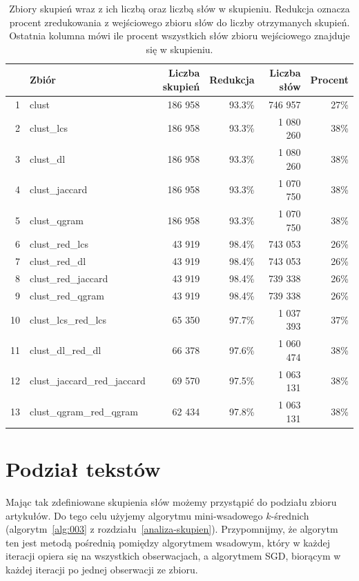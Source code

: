 \documentclass{praca1}
\begin{document}
\begin{table}[!h]
\centering
\begin{tabular}{|rl|rr|rr|}
  \hline
 & Zbiór & Liczba skupień & Redukcja & Liczba słów & Procent \\ 
  \hline
1 & clust & 186 958 & 93.3\% & 746 957 & 27\% \\ 
  2 & clust\_lcs & 186 958 & 93.3\% & 1 080 260 & 38\% \\ 
  3 & clust\_dl & 186 958 & 93.3\% & 1 080 260 & 38\% \\ 
  4 & clust\_jaccard & 186 958 & 93.3\% & 1 070 750 & 38\% \\ 
  5 & clust\_qgram & 186 958 & 93.3\% & 1 070 750 & 38\% \\ \hline
  6 & clust\_red\_lcs & 43 919 & 98.4\% & 743 053 & 26\% \\ 
  7 & clust\_red\_dl & 43 919 & 98.4\% & 743 053 & 26\% \\ 
  8 & clust\_red\_jaccard & 43 919 & 98.4\% & 739 338 & 26\% \\ 
  9 & clust\_red\_qgram & 43 919 & 98.4\% & 739 338 & 26\% \\ \hline
  10 & clust\_lcs\_red\_lcs & 65 350 & 97.7\% & 1 037 393 & 37\% \\ 
  11 & clust\_dl\_red\_dl & 66 378 & 97.6\% & 1 060 474 & 38\% \\ 
  12 & clust\_jaccard\_red\_jaccard & 69 570 & 97.5\% & 1 063 131 & 38\% \\ 
  13 & clust\_qgram\_red\_qgram & 62 434 & 97.8\% & 1 063 131 & 38\% \\ 
   \hline
\end{tabular}
\caption{Zbiory skupień wraz z ich liczbą oraz liczbą słów w skupieniu. Redukcja oznacza procent zredukowania z wejściowego zbioru słów do liczby otrzymanych skupień. Ostatnia kolumna mówi ile procent wszystkich słów zbioru wejściowego znajduje się w skupieniu.}
\label{tab:005}
\end{table}

\section{Podział tekstów}

Mając tak zdefiniowane skupienia słów możemy przystąpić do podziału zbioru artykułów. Do tego celu użyjemy algorytmu mini-wsadowego $k$-średnich (algorytm~\ref{alg:003} z rozdziału~\ref{analiza-skupien}). Przypomnijmy, że algorytm ten jest metodą pośrednią pomiędzy algorytmem wsadowym, który w każdej iteracji opiera się na wszystkich obserwacjach, a algorytmem SGD, biorącym w każdej iteracji po jednej obserwacji ze zbioru. 
\end{document}
